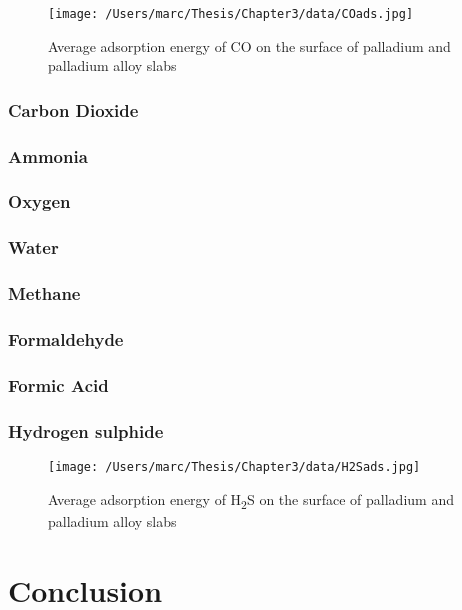 \begin{landscape}
    \begin{figure}
        \centering
        \texttt{[image: /Users/marc/Thesis/Chapter3/data/COads.jpg]}
        \caption{Average adsorption energy of CO on the surface of palladium and palladium alloy slabs}
        \label{h2ads}
      \end{figure}
    
    \end{landscape}
\subsubsection{Carbon Dioxide}
\subsubsection{Ammonia}
\subsubsection{Oxygen}
\subsubsection{Water}
\subsubsection{Methane}
\subsubsection{Formaldehyde}
\subsubsection{Formic Acid}
\subsubsection{Hydrogen sulphide}
\begin{landscape}

\begin{figure}
    \centering
    \texttt{[image: /Users/marc/Thesis/Chapter3/data/H2Sads.jpg]}
    \caption{Average adsorption energy of H\textsubscript{2}S on the surface of palladium and palladium alloy slabs}
    \label{h2ads}
  \end{figure}
\end{landscape}


\section{Conclusion}

